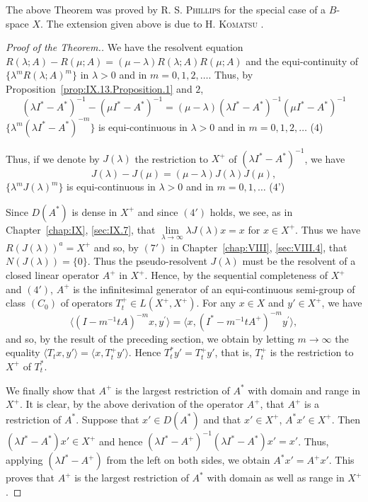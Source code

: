 \begin{remarku} The above Theorem was proved by R. S. \textsc{Phillips} \cite{phillips252} for the special case of a $B$-space $X$. The extension given above is due to H. \textsc{Komatsu} \cite{komatsu156}. 
\end{remarku}

\begin{proof}[Proof of the Theorem.]
We have the resolvent equation $R(\lambda; A) - R(\mu; A) = (\mu - \lambda)R(\lambda; A)R(\mu; A)$ and the equi-continuity of $\{\lambda^m R(\lambda; A)^m\}$ in $\lambda > 0$ and in $m = 0, 1, 2, \ldots$. Thus, by Proposition~\ref{prop:IX.13.Proposition.1} and $2$,
\begin{equation}\label{eq:IX.13.3}
(\lambda I ^{*} - A ^{*}) ^{-1} - (\mu I ^{*} - A ^{*}) ^{-1} = (\mu - \lambda) (\lambda I ^{*} - A ^{*}) ^{-1} (\mu I ^{*} - A ^{*}) ^{-1}
\end{equation}
$\{\lambda^m (\lambda I^* - A^*)^{-m}\}$ is equi-continuous in $\lambda > 0$ and in $m = 0,1,2,\ldots$ ($4$) 

Thus, if we denote by $J(\lambda)$ the restriction to $X^{+}$ of $(\lambda I^{*} - A^{*})^{-1}$, we have 
\begin{equation}\tag{3'}\label{eq:IX.13.3'}
J (\lambda) - J (\mu) = (\mu - \lambda) J (\lambda) J (\mu),
\end{equation}
$\{\lambda^m J(\lambda)^m\}$ is equi-continuous in $\lambda > 0$ and in $m = 0, 1, \ldots$ ($4$') 

Since $D(A^{*})$ is dense in $X^{+}$ and since $(4')$ holds, we see, as in Chapter~\ref{chap:IX}, \ref{sec:IX.7}, that $\lim\limits_{\lambda \to \infty} \lambda J(\lambda) x = x$ for $x \in X^{+}$. Thus we have $R(J(\lambda))^{a} = X^{+}$ and so, by $(7')$ in Chapter~\ref{chap:VIII}, \ref{sec:VIII.4}, that $N(J(\lambda)) = \{0\}$. Thus the pseudo-resolvent $J(\lambda)$ must be the resolvent of a closed linear operator $A^{+}$ in $X^{+}$. Hence, by the sequential completeness of $X^{+}$ and $(4')$, $A^{+}$ is the infinitesimal generator of an equi-continuous semi-group of class $(C_0)$ of operators $T_t^+ \in L(X^+, X^+)$. For any $x \in X$ and $y' \in X^{+}$, we have 
\[
\langle (I - m ^{-1} t A) ^{-m} x, y ^{\prime} \rangle = \langle x, (I ^{*} - m ^{-1} t A ^{+}) ^{-m} y ^{\prime} \rangle ,
\]
and so, by the result of the preceding section, we obtain by letting $m \to \infty$ the equality $\langle T_{t}x, y' \rangle = \langle x, T_{t}^{+}y' \rangle$. Hence $T_{t}^{*}y' = T_{t}^{+}y'$, that is, $T_{t}^{+}$ is the restriction to $X^{+}$ of $T_{t}^{*}$. 

We finally show that $A^{+}$ is the largest restriction of $A^{*}$ with domain and range in $X^{+}$. It is clear, by the above derivation of the operator $A^{+}$, that $A^{+}$ is a restriction of $A^{*}$. Suppose that $x' \in D(A^{*})$ and that $x' \in X^{+}$, $A^{*}x' \in X^{+}$. Then $(\lambda I^{*} - A^{*})x' \in X^{+}$ and hence $(\lambda I^{*} - A^{+})^{-1}(\lambda I^{*} - A^{*})x' = x'$. Thus, applying $(\lambda I^{*} - A^{+})$ from the left on both sides, we obtain $A^{*}x' = A^{+}x'$. This proves that $A^{+}$ is the largest restriction of $A^{*}$ with domain as well as range in $X^{+}$. 
\end{proof}
